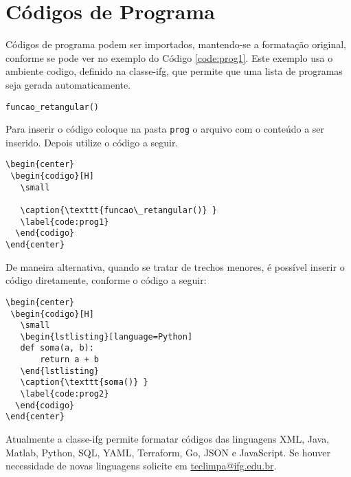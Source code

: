 \section{Códigos de Programa}
\label{sec:progs} 

Códigos de programa podem ser importados, mantendo-se a formatação original, conforme se pode ver no exemplo do Código \ref{code:prog1}. Este exemplo usa o ambiente \textsf{codigo}, definido na \textsf{classe-ifg}, que permite que uma lista de programas seja gerada automaticamente.

\begin{center}
 \begin{codigo}[H]
   \small
   
   \caption{\texttt{funcao\_retangular()} }
   \label{code:prog1}
  \end{codigo}
\end{center}

Para inserir o código coloque na pasta \verb|prog| o arquivo com o conteúdo a ser inserido. Depois utilize o código a seguir. 

\begin{verbatim}
\begin{center}
 \begin{codigo}[H]
   \small
   
   \caption{\texttt{funcao\_retangular()} }
   \label{code:prog1}
  \end{codigo}
\end{center}
\end{verbatim}

De maneira alternativa, quando se tratar de trechos menores, é possível inserir o código diretamente, conforme o código a seguir: 

\begin{verbatim}
\begin{center}
 \begin{codigo}[H]
   \small
   \begin{lstlisting}[language=Python]
   def soma(a, b):
       return a + b
   \end{lstlisting}
   \caption{\texttt{soma()} }
   \label{code:prog2}
  \end{codigo}
\end{center}
\end{verbatim}


Atualmente a \textsf{classe-ifg} permite formatar códigos das linguagens XML, Java, Matlab, Python, SQL, YAML, Terraform, Go, JSON e JavaScript. Se houver necessidade de novas linguagens solicite em \url{teclimpa@ifg.edu.br}.

